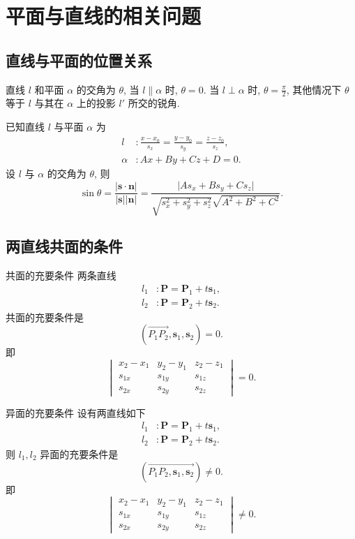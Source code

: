 \documentclass[cn,toc=twocol]{elegantbook}
\newcommand{\ve}[1]{\boldsymbol{#1}}
\newcommand{\Ve}[1]{\overrightarrow{#1}}
\begin{document}
\section{平面与直线的相关问题}
\subsection{直线与平面的位置关系}
\begin{definition}
	直线 $l$ 和平面 $\alpha$ 的交角为 $\theta$, 当 $l \parallel \alpha$ 时, $\theta = 0$. 当 $l \perp \alpha$ 时, $\theta = \frac{\pi}{2}$, 其他情况下 $\theta$ 等于 $l$ 与其在 $\alpha$ 上的投影 $l'$ 所交的锐角. 
\end{definition}

\begin{theorem}
	已知直线 $l$ 与平面 $\alpha$ 为
	\[
	\begin{aligned}
		l &: \frac{x - x_0}{s_x} = \frac{y - y_0}{s_y} = \frac{z - z_0}{s_z},\\
		\alpha &: A x + B y + C z + D = 0.
	\end{aligned}
	\]
	设 $l$ 与 $\alpha$ 的交角为 $\theta$, 则
	\[
		\sin \theta = \frac{\lvert \ve s \cdot \ve n \rvert}{\lvert \ve s \rvert \lvert \ve n \rvert} = \frac{\lvert A s_x + B s_y + C s_z \rvert}{\sqrt{s_x^2 + s_y^2 + s_z^2}\sqrt{A^2 + B^2 + C^2}}.
	\]
\end{theorem}

\subsection{两直线共面的条件}

\begin{theorem}{共面的充要条件}
	两条直线
	\[
	\begin{aligned}
		l_1 &: \ve P = \ve P_1 + t \ve s_1,\\
		l_2 &: \ve P = \ve P_2 + t \ve s_2.
	\end{aligned}
	\]
	共面的充要条件是
	\[
		(\Ve{P_1P_2}, \ve s_1, \ve s_2) = 0.
	\]
	即
	\[
		\begin{vmatrix}
			x_2 - x_1 & y_2 - y_1 & z_2 - z_1\\
			s_{1x} & s_{1y} & s_{1z}\\
			s_{2x} & s_{2y} & s_{2z}
		\end{vmatrix} = 0.
	\]
\end{theorem}
\begin{corollary}{异面的充要条件}
	设有两直线如下
	\[
	\begin{aligned}
		l_1 &: \ve P = \ve P_1 + t \ve s_1,\\
		l_2 &: \ve P = \ve P_2 + t \ve s_2.
	\end{aligned}
	\]
	则 $l_1, l_2$ 异面的充要条件是
	\[
		(\Ve{P_1P_2, \ve s_1, \ve s_2}) \neq 0.
	\]
	即
	\[
		\begin{vmatrix}
			x_2 - x_1 & y_2 - y_1 & z_2 - z_1\\
			s_{1x} & s_{1y} & s_{1z}\\
			s_{2x} & s_{2y} & s_{2z}
		\end{vmatrix} \neq 0.
	\]
\end{corollary}
\end{document}
